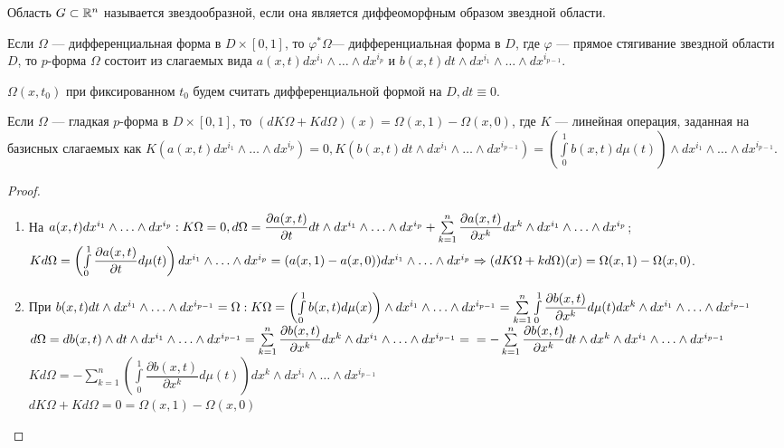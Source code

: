 \begin{Def}
	Область $G\subset\R^n$ называется звездообразной, если она является диффеоморфным образом звездной области.
\end{Def}

Если $\Omega$ --- дифференциальная форма в $D\times[0,1]$, то $\varphi^*\Omega$--- дифференциальная форма в $D$, где $\varphi$ --- прямое стягивание звездной области $D$, то $p$-форма $\Omega$ состоит из слагаемых вида $a(x,t)dx^{i_1}\wedge\ldots\wedge dx^{i_p}$ и $b(x,t)dt\wedge dx^{i_1}\wedge\ldots\wedge dx^{i_{p-1}}$.

$\Omega(x,t_0)$ при фиксированном $t_0$ будем считать дифференциальной формой на $D, dt\equiv 0$.

\begin{lemma}
	Если $\Omega$ --- гладкая $p$-форма в $D\times[0,1]$, то $(dK\Omega+Kd\Omega)(x)=\Omega(x,1)-\Omega(x,0)$, где $K$ --- линейная операция, заданная на базисных слагаемых как $K(a(x,t)dx^{i_1}\wedge\ldots\wedge dx^{i_p})=0,K(b(x,t)dt\wedge dx^{i_1}\wedge\ldots\wedge dx^{i_{p-1}})=\left(\int\limits_{0}^1b(x,t)d\mu(t)\right)\wedge dx^{i_1}\wedge\ldots\wedge dx^{i_{p-1}}$.
\end{lemma}

\begin{proof}\ 
	\begin{enumerate}
		\item На $a(x,t)dx^{i_1}\wedge\ldots\wedge dx^{i_{p}}: K\Omega=0, \\d\Omega=\dfrac{\partial a(x,t)}{\partial t}dt\wedge dx^{i_1}\wedge\ldots\wedge dx^{i_{p}}+\sum\limits_{k=1}^n\dfrac{\partial a(x,t)}{\partial x^k}dx^k\wedge dx^{i_1}\wedge\ldots\wedge dx^{i_{p}}$;\\ $Kd\Omega=\left(\int\limits_{0}^1\dfrac{\partial a(x,t)}{\partial t}d\mu(t)\right)dx^{i_1}\wedge\ldots\wedge dx^{i_p}=(a(x, 1)-a(x,0))dx^{i_1}\wedge\ldots\wedge dx^{i_p}\Rightarrow\\ (dK\Omega+kd\Omega)(x)=\Omega(x,1)-\Omega(x,0)$.
		\item При $b(x,t)dt\wedge dx^{i_1}\wedge\ldots\wedge dx^{i_{p-1}}=\Omega:\\ K\Omega=\left(\int\limits_{0}^1b(x,t)d\mu(x)\right)\wedge dx^{i_1}\wedge\ldots\wedge dx^{i_{p-1}}=\sum\limits_{k=1}^n \int\limits_{0}^1 \dfrac{\partial b(x,t)}{\partial x^k}d\mu(t)dx^k\wedge dx^{i_1}\wedge\ldots\wedge dx^{i_{p-1}}$
		$d\Omega=db(x,t)\wedge dt\wedge dx^{i_1}\wedge\ldots\wedge dx^{i_{p-1}}=\sum\limits_{k=1}^n\dfrac{\partial b(x,t)}{\partial x^k}dx^k\wedge dx^{i_1}\wedge\ldots\wedge dx^{i_{p-1}}=\\=-\sum\limits_{k=1}^n\dfrac{\partial b(x,t)}{\partial x^k}dt\wedge dx^k\wedge dx^{i_1}\wedge\ldots\wedge dx^{i_{p-1}}$\\
		$Kd\Omega=-\sum\limits_{k=1}^n\left(\int\limits_{0}^1 \dfrac{\partial b(x,t)}{\partial x^k}d\mu(t)\right)dx^k\wedge dx^{i_1}\wedge\ldots\wedge dx^{i_{p-1}}$\\
		$dK\Omega+Kd\Omega=0=\Omega(x,1)-\Omega(x,0)$
	\end{enumerate}
\end{proof}

